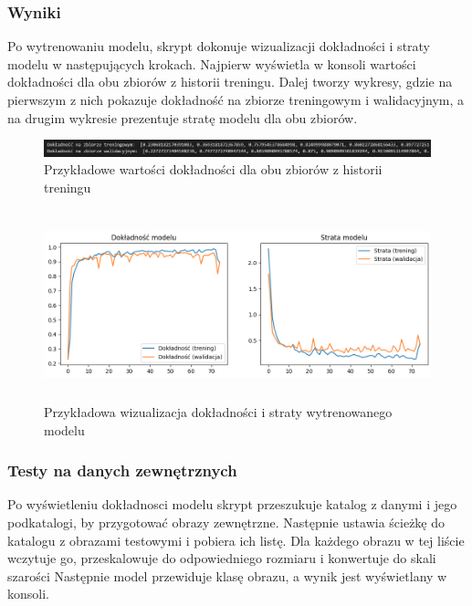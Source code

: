 \subsubsection{Wyniki}
Po wytrenowaniu modelu, skrypt dokonuje wizualizacji dokładności i straty modelu w następujących krokach.
Najpierw wyświetla w konsoli wartości dokładności dla obu zbiorów z historii treningu.
Dalej tworzy wykresy, gdzie na pierwszym z nich pokazuje dokładność na zbiorze treningowym i walidacyjnym,
a na drugim wykresie prezentuje stratę modelu dla obu zbiorów.

\begin{figure}[ht]
	\centering
	\includegraphics[width=15cm]{partials/images/test-standard-result.png}
	\caption{Przykładowe wartości dokładności dla obu zbiorów z historii treningu}
	\label{Fig:tests-wyniki-2}
\end{figure}
\FloatBarrier

\begin{figure}[ht]
	\centering
	\includegraphics[height=5.5cm]{partials/images/tests/v2_epoch75.png}
	\caption{Przykładowa wizualizacja dokładności i straty wytrenowanego modelu}
	\label{Fig:tests-wyniki-1}
\end{figure}
\FloatBarrier

\subsubsection{Testy na danych zewnętrznych}
Po wyświetleniu dokładnosci modelu skrypt przeszukuje katalog z danymi i jego podkatalogi, by przygotować obrazy zewnętrzne.
Następnie ustawia ścieżkę do katalogu z obrazami testowymi i pobiera ich listę.
Dla każdego obrazu w tej liście wczytuje go, przeskalowuje do odpowiedniego rozmiaru i konwertuje do skali szarości
Następnie model przewiduje klasę obrazu, a wynik jest wyświetlany w konsoli.

